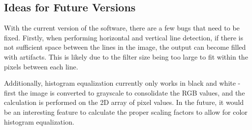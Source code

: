 \documentclass{article}
\let\Oldsubsection\subsection
\renewcommand{\subsection}{\FloatBarrier\Oldsubsection}
\begin{document}
  \subsection{Ideas for Future Versions}

  With the current version of the software, there are a few bugs that need to be fixed. Firstly, when performing horizontal and vertical line detection, if there is not sufficient space between the lines in the image, the output can become filled with artifacts. This is likely due to the filter size being too large to fit within the pixels between each line.

  Additionally, histogram equalization currently only works in black and white - first the image is converted to grayscale to consolidate the RGB values, and the calculation is performed on the 2D array of pixel values. In the future, it would be an interesting feature to calculate the proper scaling factors to allow for color histogram equalization.
  
  \newpage

  \printbibliography

  
\end{document}
